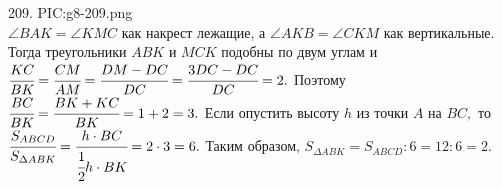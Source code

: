 209. {{PIC:g8-209.png}}\\
$\angle BAK=\angle KMC$ как накрест лежащие, а $\angle AKB=\angle CKM$ как вертикальные. Тогда треугольники $ABK$ и $MCK$ подобны по двум углам и $\cfrac{KC}{BK}=\cfrac{CM}{AM}=\cfrac{DM-DC}{DC}=\cfrac{3DC-DC}{DC}=2.$ Поэтому $\cfrac{BC}{BK}=\cfrac{BK+KC}{BK}=1+2=3.$ Если опустить высоту $h$ из точки $A$ на $BC,$ то $\cfrac{S_{ABCD}}{S_{\Delta ABK}}=\cfrac{h\cdot BC}{\cfrac{1}{2}h\cdot BK}=2\cdot3=6.$ Таким образом, $S_{\Delta ABK}=S_{ABCD}:6=12:6=2.$\\
